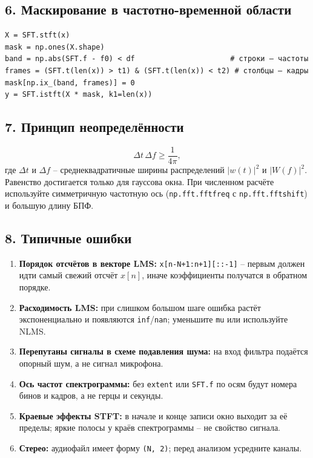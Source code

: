\documentclass[12pt,a4paper,openany]{book}
\providecommand{\tightlist}{\setlength{\itemsep}{0pt}\setlength{\parskip}{0pt}}
\begin{document}
\subsection*{6. Маскирование в частотно-временной области}

\begin{Verbatim}[fontsize=\small, breaklines, breakanywhere]
X = SFT.stft(x)
mask = np.ones(X.shape)
band = np.abs(SFT.f - f0) < df                      # строки – частоты
frames = (SFT.t(len(x)) > t1) & (SFT.t(len(x)) < t2) # столбцы – кадры
mask[np.ix_(band, frames)] = 0
y = SFT.istft(X * mask, k1=len(x))
\end{Verbatim}

\subsection*{7. Принцип неопределённости}

\[
\Delta t\,\Delta f \ge \frac{1}{4\pi},
\]
где \(\Delta t\) и \(\Delta f\) -- среднеквадратичные ширины распределений \(|w(t)|^2\) и \(|W(f)|^2\). Равенство достигается только для гауссова окна. При численном расчёте используйте симметричную частотную ось (\texttt{np.\allowbreak{}fft.\allowbreak{}fftfreq} с \texttt{np.\allowbreak{}fft.\allowbreak{}fftshift}) и большую длину БПФ.

\subsection*{8. Типичные ошибки}

\begin{enumerate}
\def\labelenumi{\arabic{enumi}.}
\tightlist
\item
  \textbf{Порядок отсчётов в векторе LMS:} \texttt{x{[}n-N+1:\allowbreak{}n+1{]}{[}:\allowbreak{}:\allowbreak{}-1{]}} -- первым должен идти самый свежий отсчёт \(x[n]\), иначе коэффициенты получатся в обратном порядке.
\item
  \textbf{Расходимость LMS:} при слишком большом шаге ошибка растёт экспоненциально и появляются \texttt{inf}/\texttt{nan}; уменьшите \texttt{mu} или используйте NLMS.
\item
  \textbf{Перепутаны сигналы в схеме подавления шума:} на вход фильтра подаётся опорный шум, а не сигнал микрофона.
\item
  \textbf{Ось частот спектрограммы:} без \texttt{extent} или \texttt{SFT.\allowbreak{}f} по осям будут номера бинов и кадров, а не герцы и секунды.
\item
  \textbf{Краевые эффекты STFT:} в начале и конце записи окно выходит за её пределы; яркие полосы у краёв спектрограммы -- не свойство сигнала.
\item
  \textbf{Стерео:} аудиофайл имеет форму \texttt{(\allowbreak{}N,\allowbreak{}\ 2)}; перед анализом усредните каналы.
\end{enumerate}
\end{document}

